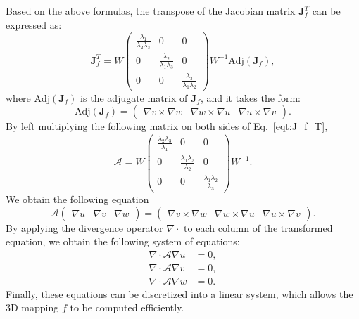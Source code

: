 \documentclass{article}
\begin{document}
Based on the above formulas, the transpose of the Jacobian matrix $\mathbf{J}^T_f$ can be expressed as:
\begin{equation}
    \mathbf{J}^T_f = W\begin{pmatrix}
    \frac{\lambda_1}{\lambda_2 \lambda_3} & 0 & 0 \\
    0 & \frac{\lambda_2}{\lambda_1 \lambda_3} & 0 \\
    0 & 0 & \frac{\lambda_3}{\lambda_1 \lambda_2}
    \end{pmatrix}W^{-1} \text{Adj}(\mathbf{J}_f),
    \label{eqt:J_f_T}
\end{equation}
where $\text{Adj}(\mathbf{J}_f)$ is the adjugate matrix of $\mathbf{J}_f$, and it takes the form:
\begin{equation}
    \text{Adj}(\mathbf{J}_f) = \begin{pmatrix}
\nabla v \times \nabla w & \nabla w \times \nabla u & \nabla u \times \nabla v
\end{pmatrix}.
\end{equation}
By left multiplying the following matrix on both sides of Eq.~\eqref{eqt:J_f_T},
\begin{equation}
    \mathcal{A} = W\begin{pmatrix}
    \frac{\lambda_2 \lambda_3}{\lambda_1} & 0 & 0 \\
    0 & \frac{\lambda_1 \lambda_3}{\lambda_2} & 0 \\
    0 & 0 & \frac{\lambda_1 \lambda_2}{\lambda_3}
    \end{pmatrix}W^{-1}.
\end{equation}
We obtain the following equation
\begin{equation}
    \mathcal{A}\begin{pmatrix}
\nabla u  & \nabla v & \nabla w 
\end{pmatrix} = \begin{pmatrix}
\nabla v \times \nabla w & \nabla w \times \nabla u & \nabla u \times \nabla v
\end{pmatrix}.
\end{equation}
By applying the divergence operator $\nabla \cdot$ to each column of the transformed equation, we obtain the following system of equations:
\begin{align}
    \nabla \cdot\mathcal{A}\nabla u &= 0, \\
    \nabla \cdot\mathcal{A}\nabla v &= 0, \\
    \nabla \cdot\mathcal{A}\nabla w &= 0.
\end{align}
Finally, these equations can be discretized into a linear system, which allows the 3D mapping $f$ to be computed efficiently.
\end{document}
